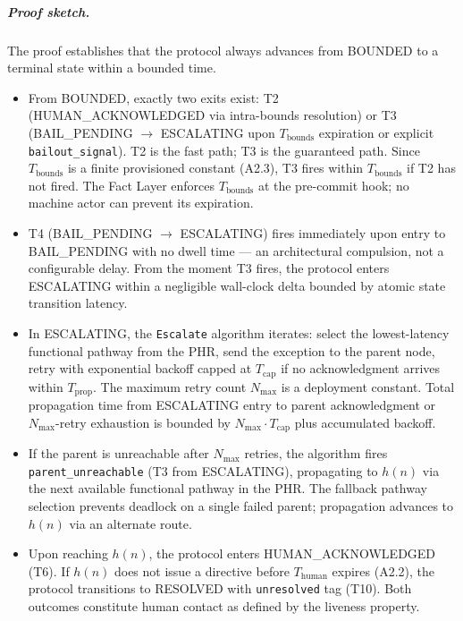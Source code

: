 \subparagraph{Proof sketch.} The proof establishes that the protocol always advances from BOUNDED to a terminal state within a bounded time.

\begin{itemize}
\item[Step 1.] From BOUNDED, exactly two exits exist: T2 (HUMAN\_ACKNOWLEDGED via intra-bounds resolution) or T3 (BAIL\_PENDING $\rightarrow$ ESCALATING upon $T_{\text{bounds}}$ expiration or explicit \texttt{bailout\_signal}). T2 is the fast path; T3 is the guaranteed path. Since $T_{\text{bounds}}$ is a finite provisioned constant (A2.3), T3 fires within $T_{\text{bounds}}$ if T2 has not fired. The Fact Layer enforces $T_{\text{bounds}}$ at the pre-commit hook; no machine actor can prevent its expiration.

\item[Step 2.] T4 (BAIL\_PENDING $\rightarrow$ ESCALATING) fires immediately upon entry to BAIL\_PENDING with no dwell time — an architectural compulsion, not a configurable delay. From the moment T3 fires, the protocol enters ESCALATING within a negligible wall-clock delta bounded by atomic state transition latency.

\item[Step 3.] In ESCALATING, the \texttt{Escalate} algorithm iterates: select the lowest-latency functional pathway from the PHR, send the exception to the parent node, retry with exponential backoff capped at $T_{\text{cap}}$ if no acknowledgment arrives within $T_{\text{prop}}$. The maximum retry count $N_{\max}$ is a deployment constant. Total propagation time from ESCALATING entry to parent acknowledgment or $N_{\max}$-retry exhaustion is bounded by $N_{\max} \cdot T_{\text{cap}}$ plus accumulated backoff.

\item[Step 4.] If the parent is unreachable after $N_{\max}$ retries, the algorithm fires \texttt{parent\_unreachable} (T3 from ESCALATING), propagating to $h(n)$ via the next available functional pathway in the PHR. The fallback pathway selection prevents deadlock on a single failed parent; propagation advances to $h(n)$ via an alternate route.

\item[Step 5.] Upon reaching $h(n)$, the protocol enters HUMAN\_ACKNOWLEDGED (T6). If $h(n)$ does not issue a directive before $T_{\text{human}}$ expires (A2.2), the protocol transitions to RESOLVED with \texttt{unresolved} tag (T10). Both outcomes constitute human contact as defined by the liveness property.
\end{itemize}

